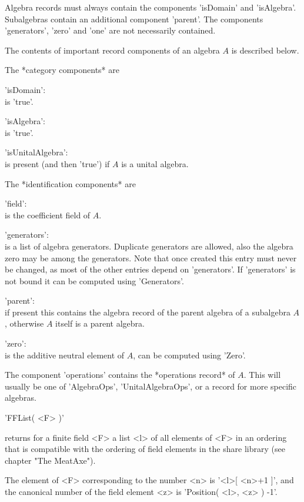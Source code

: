 Algebra records must always contain the components 'isDomain' and
'isAlgebra'.  Subalgebras contain  an additional component 'parent'.
The components 'generators', 'zero' and 'one' are not necessarily
contained.

The contents of important record components of an algebra $A$ is
described below.

The *category components* are

'isDomain': \\
        is 'true'.

'isAlgebra': \\
        is 'true'.

'isUnitalAlgebra': \\
        is present (and then 'true') if $A$ is a unital algebra.

The *identification components* are

'field': \\
        is the coefficient field of $A$.

'generators': \\
        is a list of algebra generators. Duplicate generators are allowed,
        also the algebra zero may be among the generators.
        Note that once created this entry must never be changed, as
        most of the other entries depend on 'generators'.
        If 'generators' is not bound it can be computed using 'Generators'.

'parent': \\
        if present this contains the algebra record of the parent algebra
        of a subalgebra $A$, otherwise $A$ itself is a parent algebra.

'zero': \\
        is the additive neutral element of $A$, can be computed using
        'Zero'.

The component 'operations' contains  the *operations record* of $A$.
This will usually be one of 'AlgebraOps', 'UnitalAlgebraOps', or a
record for more specific algebras.


'FFList( <F> )'

returns for a finite field <F> a list <l> of all elements of <F> in an
ordering that is compatible with the ordering of field elements in the
{\MeatAxe} share library (see chapter "The MeatAxe").

The element of <F> corresponding to the number <n> is
'<l>[ <n>+1 ]',
and the canonical number of the field element <z> is
'Position( <l>, <z> ) -1'.

